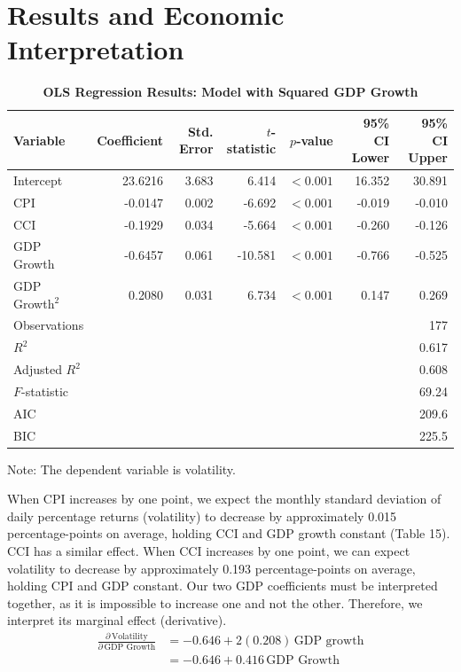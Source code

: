 \section{Results and Economic Interpretation}
\begin{table}[H]
\centering
\caption{\textbf{OLS Regression Results: Model with Squared GDP Growth}}
\label{tab:ols_quadratic}
\renewcommand{\arraystretch}{1.3}
\begin{tabularx}{\textwidth}{Xrrrrrr}
\toprule
Variable & Coefficient & Std. Error & $t$-statistic & $p$-value & 95\% CI Lower & 95\% CI Upper \\
\midrule
Intercept & 23.6216 & 3.683 & 6.414 & $<0.001$ & 16.352 & 30.891 \\
CPI & -0.0147 & 0.002 & -6.692 & $<0.001$ & -0.019 & -0.010 \\
CCI & -0.1929 & 0.034 & -5.664 & $<0.001$ & -0.260 & -0.126 \\
GDP Growth & -0.6457 & 0.061 & -10.581 & $<0.001$ & -0.766 & -0.525 \\
GDP Growth$^2$ & 0.2080 & 0.031 & 6.734 & $<0.001$ & 0.147 & 0.269 \\
\midrule
Observations & \multicolumn{6}{r}{177} \\
$R^2$ & \multicolumn{6}{r}{0.617} \\
Adjusted $R^2$ & \multicolumn{6}{r}{0.608} \\
$F$-statistic & \multicolumn{6}{r}{69.24}\\
AIC & \multicolumn{6}{r}{209.6} \\
BIC & \multicolumn{6}{r}{225.5} \\
\bottomrule
\end{tabularx}
\vspace{0.8em}

\footnotesize Note: The dependent variable is volatility.
\end{table}
When CPI increases by one point, we expect the monthly standard deviation of daily percentage returns (volatility) to decrease by approximately 0.015 percentage-points on average, holding CCI and GDP growth constant (Table 15). CCI has a similar effect. When CCI increases by one point, we can expect volatility to decrease by approximately 0.193 percentage-points on average, holding CPI and GDP constant. Our two GDP coefficients must be interpreted together, as it is impossible to increase one and not the other. Therefore, we interpret its marginal effect (derivative). 
\begin{equation*}
\begin{split}
\frac{\partial\, \text{Volatility}}{\partial\, \text{GDP Growth}} &= -0.646 + 2(0.208)\,\text{GDP growth} \\
&= -0.646 + 0.416\,\text{GDP Growth}
\end{split}
\label{eq:marginal_gdp}
\end{equation*}
